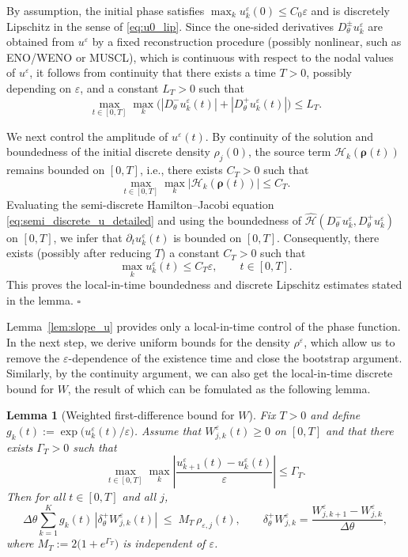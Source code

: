 \documentclass[11pt, dina4, amsfont12]{article}
\newtheorem{lemma}{Lemma}[section]
\begin{document}
By assumption, the initial phase satisfies
$\max_k u_k^\varepsilon(0)\le C_0\varepsilon$ and is discretely Lipschitz in the
sense of \eqref{eq:u0_lip}.  
Since the one-sided derivatives $D_\theta^\pm u_k^\varepsilon$ are obtained from
$u^\varepsilon$ by a fixed reconstruction procedure (possibly nonlinear, such as
ENO/WENO or MUSCL), which is continuous with respect to the nodal values of
$u^\varepsilon$, it follows from continuity that there exists a time
$T>0$, possibly depending on $\varepsilon$, and a constant $L_T>0$ such that
\[
\max_{t\in[0,T]}\max_k
\big(|D_\theta^-u_k^\varepsilon(t)|
    +|D_\theta^+u_k^\varepsilon(t)|\big)
\le L_T .
\]

We next control the amplitude of $u^\varepsilon(t)$.
By continuity of the solution and boundedness of the initial discrete density
$\rho_j(0)$, the source term $\mathcal H_k(\boldsymbol\rho(t))$ remains bounded on
$[0,T]$, i.e., there exists $C_T>0$ such that
\[
\max_{t\in[0,T]}\max_k |\mathcal H_k(\boldsymbol\rho(t))|\le C_T .
\]
Evaluating the semi-discrete Hamilton--Jacobi equation
\eqref{eq:semi_discrete_u_detailed} and using the boundedness of
$\widehat{\mathcal H}(D_\theta^-u_k^\varepsilon,D_\theta^+u_k^\varepsilon)$ on
$[0,T]$, we infer that $\partial_t u_k^\varepsilon(t)$ is bounded on $[0,T]$.
Consequently, there exists (possibly after reducing $T$) a constant $C_T>0$ such
that
\[
\max_k u_k^\varepsilon(t)\le C_T\varepsilon,
\qquad t\in[0,T].
\]
This proves the local-in-time boundedness and discrete Lipschitz estimates stated in the lemma.
\hfill$\square$



\medskip

Lemma~\ref{lem:slope_u} provides only a local-in-time control of the phase
function. In the next step, we derive uniform bounds for the density
$\rho^\varepsilon$, which allow us to remove the $\varepsilon$-dependence of the
existence time and close the bootstrap argument.
Similarly, by the continuity argument, we can also get the local-in-time discrete bound for $W$, the result of which can be fomulated as the following lemma. 
\begin{lemma}[Weighted first-difference bound for $W$]\label{lem:W_diff}
Fix $T>0$ and define $g_k(t):=\exp\!\big(u_k^\varepsilon(t)/\varepsilon\big)$.
Assume that $W_{j,k}^\varepsilon(t)\ge0$ on $[0,T]$ and that
there exists $\Gamma_T>0$ such that
\begin{equation}\label{eq:weight_ratio_from_slope}
\max_{t\in[0,T]}\max_k
\left|\frac{u_{k+1}^\varepsilon(t)-u_k^\varepsilon(t)}{\varepsilon}\right|
\le \Gamma_T .
\end{equation}
Then for all $t\in[0,T]$ and all $j$,
\begin{equation}\label{eq:weighted_first_diff_W_simple}
\Delta\theta\sum_{k=1}^K
g_k(t)\,|\delta_\theta^+ W_{j,k}^\varepsilon(t)|
\;\le\;
M_T\,\rho_{\varepsilon,j}(t),
\qquad
\delta_\theta^+W_{j,k}^\varepsilon=\frac{W_{j,k+1}^\varepsilon-W_{j,k}^\varepsilon}{\Delta\theta},
\end{equation}
where $M_T:=2\bigl(1+e^{\Gamma_T}\bigr)$ is independent of $\varepsilon$.
\end{lemma}
\end{document}
